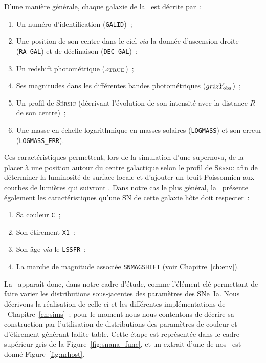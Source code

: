 \documentclass[../main/main.tex]{subfiles}
\begin{document}
D'une manière générale, chaque galaxie de la \hostlib\ est décrite par~:
\begin{enumerate}
    \item Un numéro d'identification (\texttt{GALID})~;
    \item Une position de son centre dans le ciel \textit{via} la donnée
        d'ascension droite (\texttt{RA\_GAL}) et de déclinaison
        (\texttt{DEC\_GAL})~;
    \item Un redshift photométrique ($z_{\rm TRUE}$)~;
    \item Ses magnitudes dans les différentes bandes photométriques ($grizY_{\rm
        obs}$)~;
    \item Un profil de \textsc{Sérsic} (décrivant l'évolution de son intensité
        avec la distance $R$ de son centre)~;
    \item Une masse en échelle logarithmique en masses solaires
        (\texttt{LOGMASS}) et son erreur (\texttt{LOGMASS\_ERR}).
\end{enumerate}
Ces caractéristiques permettent, lors de la simulation d'une supernova, de la
placer à une position autour du centre galactique selon le profil de
\textsc{Sérsic} afin de déterminer la luminosité de surface locale et d'ajouter
un bruit Poissonnien aux courbes de lumières qui suivront \citep{kessler2019}.
Dans notre cas le plus général, la \hostlib\ présente également les
caractéristiques qu'une SN de cette galaxie hôte doit respecter~:
\begin{enumerate}[resume]
    \item Sa couleur \texttt{C}~;
    \item Son étirement \texttt{X1}~:
    \item Son âge \textit{via} le \texttt{LSSFR}~;
    \item La marche de magnitude associée \texttt{SNMAGSHIFT} (voir
        Chapitre~\ref{ch:env}).
\end{enumerate}
La \hostlib\ apparaît donc, dans notre cadre d'étude, comme l'élément clé
permettant de faire varier les distributions sous-jacentes des paramètres des
SNe~Ia. Nous décrivons la réalisation de celle-ci et les différentes
implémentations de \hostlib\ Chapitre~\ref{ch:sims}~; pour le moment nous nous
contentons de décrire sa construction par l'utilisation de distributions des
paramètres de couleur et d'étirement générant ladite table. Cette étape est
représentée dans le cadre supérieur gris de la Figure~\ref{fig:snana_func}, et
un extrait d'une de nos \hostlib\ est donné Figure~\ref{fig:nrhost}.
\end{document}
